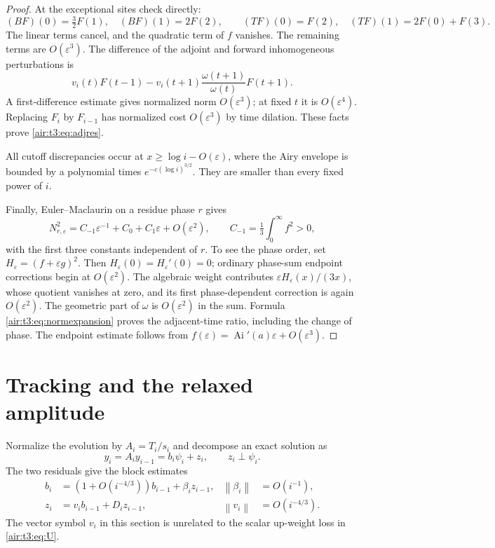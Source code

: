 \documentclass[11pt,letterpaper]{article}
\numberwithin{equation}{section}
\theoremstyle{remark}
\newcommand{\Ai}{\operatorname{Ai}}
\newcommand{\norm}[1]{\left\lVert#1\right\rVert}
\newcommand{\eps}{\varepsilon}
\begin{document}
\begin{proof}
At the exceptional sites check directly:
\[
(BF)(0)=\tfrac32F(1),\quad (BF)(1)=2F(2),\qquad
(TF)(0)=F(2),\quad (TF)(1)=2F(0)+F(3).
\]
The linear terms cancel, and the quadratic term of $f$ vanishes. The remaining terms are $O(\eps^3)$. The difference of the adjoint and forward inhomogeneous perturbations is
\[
v_i(t)F(t-1)-v_i(t+1)\frac{\omega(t+1)}{\omega(t)}F(t+1).
\]
A first-difference estimate gives normalized norm $O(\eps^3)$; at fixed $t$ it is $O(\eps^4)$. Replacing $F_i$ by $F_{i-1}$ has normalized cost $O(\eps^3)$ by time dilation. These facts prove \eqref{air:t3:eq:adjres}.

All cutoff discrepancies occur at $x\ge\log i-O(\eps)$, where the Airy envelope is bounded by a polynomial times $e^{-c(\log i)^{3/2}}$. They are smaller than every fixed power of $i$.

Finally, Euler--Maclaurin on a residue phase $r$ gives
\begin{equation}\label{air:t3:eq:normexpansion}
N_{r,\eps}^2=C_{-1}\eps^{-1}+C_0+C_1\eps+O(\eps^2),
\qquad C_{-1}=\tfrac13\int_0^\infty f^2>0,
\end{equation}
with the first three constants independent of $r$. To see the phase order, set $H_\eps=(f+\eps g)^2$. Then $H_\eps(0)=H_\eps'(0)=0$; ordinary phase-sum endpoint corrections begin at $O(\eps^2)$. The algebraic weight contributes $\eps H_\eps(x)/(3x)$, whose quotient vanishes at zero, and its first phase-dependent correction is again $O(\eps^2)$. The geometric part of $\omega$ is $O(\eps^2)$ in the sum. Formula \eqref{air:t3:eq:normexpansion} proves the adjacent-time ratio, including the change of phase. The endpoint estimate follows from $f(\eps)=\Ai'(a)\eps+O(\eps^3)$.
\end{proof}

\section{Tracking and the relaxed amplitude}
Normalize the evolution by $A_i=T_i/s_i$ and decompose an exact solution as
\[
y_i=A_i y_{i-1}=b_i\psi_i+z_i,\qquad z_i\perp\psi_i.
\]
The two residuals give the block estimates
\begin{align}
b_i&=(1+O(i^{-4/3}))b_{i-1}+\beta_i z_{i-1},
&\norm{\beta_i}&=O(i^{-1}),\label{air:t3:eq:blocks1}\\
z_i&=v_i b_{i-1}+D_i z_{i-1},
&\norm{v_i}&=O(i^{-4/3}).\label{air:t3:eq:blocks2}
\end{align}
The vector symbol $v_i$ in this section is unrelated to the scalar up-weight loss in \eqref{air:t3:eq:U}.
\end{document}
